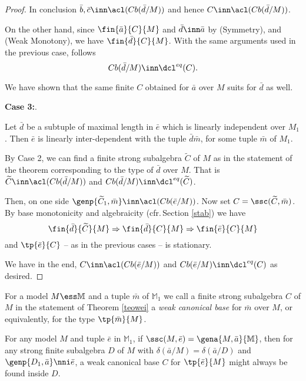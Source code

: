 \begin{proof}
In conclusion $\bar b,\bar c\inn\acl(Cb(\bar d/M))$ and hence $C\inn\acl(Cb(\bar d/M))$.

On the other hand, since $\fin{\bar a}{C}{M}$ and $\bar d\inn%
\bar a$ by (Symmetry), %
and (Weak Monotony), we have $\fin{\bar d}{C}{M}$. With the same arguments used in the previous case,
follows $$Cb(\bar d/M)\inn\dcl^{eq}(C).$$

We have shown that the same finite $C$ obtained for $\bar a$ over $M$ suits for $\bar d$ as well.

\medskip\noindent
{\bf Case 3:}.

\smallskip
Let $\bar d$ be a subtuple of maximal length in $\bar e$ which is linearly independent over $M_{1}$.
Then $\bar e$ is linearly inter-dependent with the tuple $\bar d\bar m$, for some tuple $\bar m$ of $M_{1}$.

By Case 2, we can find a finite strong subalgebra $\widetilde{C}$ of $M$ as in the statement of the theorem corresponding
to the type of $\bar d$ over $M$. That is $\widetilde{C}\inn\acl(Cb(\bar d/M))$ and $Cb(\bar d/M)\inn\dcl^{eq}(\widetilde{C})$.

Then, on one side $\genp{\widetilde{C}_{1},\bar m}\inn\acl(Cb(\bar e/M))$.
Now set $C=\ssc(\widetilde{C},\bar m)$. By base monotonicity and algebraicity (cfr.{\,}Section \ref{stab}) we have
$$\fin{\bar d}{\widetilde{C}}{M}\Rightarrow\fin{\bar d}{C}{M}\Rightarrow\fin{\bar e}{C}{M}$$
and $\tp{\bar e}{C}$ -- as in the previous cases -- is stationary.
%

We have in the end, $C\inn\acl(Cb(\bar e/M))$ and $Cb(\bar e/M)\inn\dcl^{eq}(C)$ as desired.
\end{proof}

\begin{dfn}\label{gbase}
For a model $M\ess\mathbb{M}$ and a tuple $\bar m$ of $\mathbb{M}_{1}$ we call a finite strong subalgebra $C$ of $M$ in the 
statement of Theorem \ref{teowei} a {\em weak canonical base} for $\bar m$ over $M$, or equivalently,
for the type $\tp{\bar m}{M}$.
\end{dfn}
\begin{rem}\label{re:gbase}
For any model $M$ and tuple $\bar e$ in $\mathbb{M}_{1}$,
if $\ssc(M,\bar e)=\gena{M,\bar a}{\mathbb{M}}$, then for any strong finite subalgebra $D$ of $M$ with
$\delta(\bar a/M)=\delta(\bar a/D)$ and $\genp{D_{1},\bar a}\nni\bar e$,
a weak canonical base $C$ for $\tp{\bar e}{M}$ might always be found inside $D$.
\end{rem}

